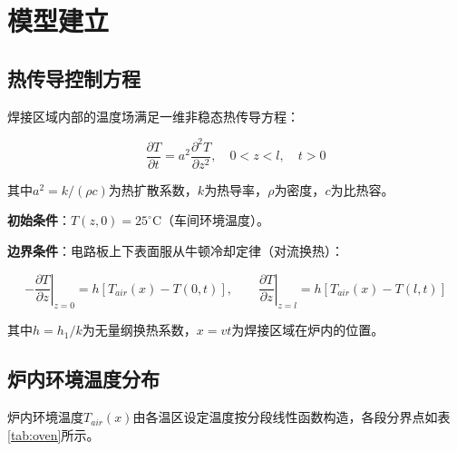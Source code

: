 \documentclass[12pt,a4paper]{ctexart}
\begin{document}
\section{模型建立}

\subsection{热传导控制方程}

焊接区域内部的温度场满足一维非稳态热传导方程\cite{ref1}：

\begin{equation}\label{eq:heat}
\frac{\partial T}{\partial t} = a^2 \frac{\partial^2 T}{\partial z^2}, \quad 0 < z < l, \quad t > 0
\end{equation}

其中$a^2 = k/(\rho c)$为热扩散系数，$k$为热导率，$\rho$为密度，$c$为比热容。

\textbf{初始条件}：$T(z,0)=25^{\circ}\mathrm{C}$（车间环境温度）。

\textbf{边界条件}：电路板上下表面服从牛顿冷却定律（对流换热）：

\begin{equation}\label{eq:bc}
-\left.\frac{\partial T}{\partial z}\right|_{z=0} = h[T_{air}(x) - T(0,t)],\qquad
\left.\frac{\partial T}{\partial z}\right|_{z=l} = h[T_{air}(x) - T(l,t)]
\end{equation}

其中$h=h_1/k$为无量纲换热系数，$x=vt$为焊接区域在炉内的位置。

\subsection{炉内环境温度分布}

炉内环境温度$T_{air}(x)$由各温区设定温度按分段线性函数构造，各段分界点如表\ref{tab:oven}所示。
\end{document}
